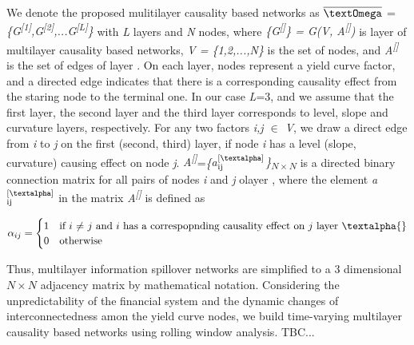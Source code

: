 \documentclass{article}
\begin{document}
We denote the proposed mulitilayer causality based networks as $\overline{\mbox{\textOmega}}$ = \textit{\{G\textsuperscript{[1]},G\textsuperscript{[2]},...G\textsuperscript{[L]}\}}
with \textit{L} layers and \textit{N} nodes, where \textit{\{G\textsuperscript{[\textalpha]}\} = G(V, A\textsuperscript{[\textalpha]})} is layer \textit{\textalpha{}} of multilayer causality based networks, \textit{V = \{1,2,...,N\}}
is the set of nodes, and  \textit{A\textsuperscript{[\textalpha]}} is the set of edges of layer \textit{\textalpha}. On each layer, nodes represent a yield curve factor, and a directed edge indicates that there is a corresponding causality effect from the staring node to the terminal one. In our case \textit{L}=3, and we assume that the first layer, the second layer and the third layer corresponds to level, slope and curvature layers, respectively.
For any two factors \textit{i,j $\in$ V}, we draw a direct edge from \textit{i} to \textit{j} on the first (second, third) layer, if node \textit{i} has a level (slope, curvature) causing effect on node \textit{j}.
\textit{A\textsuperscript{[\textalpha]}}=\textit{\{{a$^{\text{[\textalpha]}}_{\text{ij}}$\}\textsubscript{$N\times N$}}} is a directed binary connection matrix for all pairs of nodes \textit{i} and \textit{j} olayer \textit{\textalpha{}}, where the element \textit{a$^{\text{[\textalpha]}}_{\text{ij}}$} in the matrix \textit{A\textsuperscript{[\textalpha]}} is defined as

\begin{equation}
  \alpha_{ij} =
    \begin{cases}
      1 & \text{if $i$ $\neq$ $j$ and $i$ has a correspopnding causality effect on $j$ layer \textalpha{}}\\
      0 & \text{otherwise}
    \end{cases}       
\end{equation}

Thus, multilayer information spillover networks are simplified to a 3 dimensional $N\times N$ adjacency matrix by mathematical notation. Considering the unpredictability of the financial system and the dynamic changes of interconnectedness amon the yield curve nodes, we build time-varying multilayer causality based networks using rolling window analysis. TBC...

\end{document}
